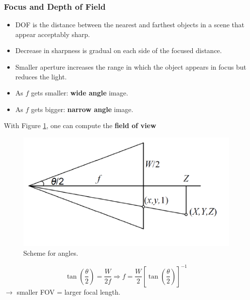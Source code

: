 \documentclass[a4paper,12 pt]{article}
\theoremstyle{definition}
\theoremstyle{remark}
\theoremstyle{definition}
\theoremstyle{definition}
\theoremstyle{definition}
\theoremstyle{remark}
\theoremstyle{definition}
\begin{document}
\subsubsection*{Focus and Depth of Field}
\begin{itemize}
\item DOF is the distance between the nearest and farthest objects in a scene that appear acceptably sharp.
\item Decrease in sharpness is gradual on each side of the focused distance.
\item Smaller aperture increases the range in which the object appears in focus but reduces the light.
\item As $f$ gets smaller: \textbf{wide angle} image.
\item As $f$ gets bigger: \textbf{narrow angle} image.
\end{itemize}
With Figure \ref{fig:wide}, one can compute the \textbf{field of view}
\begin{figure}[h!]
\begin{center}
\includegraphics[scale=0.5]{pics/wide}
\caption{Scheme for angles. \label{fig:wide}}
\end{center}
\end{figure}
\begin{equation}
\tan\left( \frac{\theta}{2}\right)=\frac{W}{2f} \Rightarrow f=\frac{W}{2}\left[ \tan \left( \frac{\theta}{2}\right)\right]^{-1}
\end{equation}
$\rightarrow$ smaller FOV = larger focal length.
\end{document}
